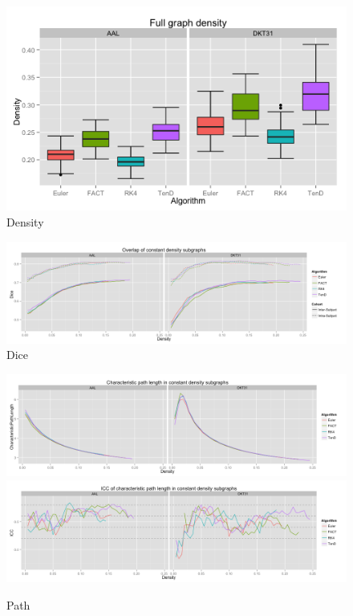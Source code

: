 \documentclass{frontiersSCNS} %
\begin{document}
\begin{figure}
\begin{center}
\includegraphics[width=0.5\linewidth]{figures/density_plot.png} 
\caption{Density}
\label{fig:density}
\end{center}
\end{figure}

\begin{figure}
\begin{center}
\includegraphics[width=0.5\linewidth]{figures/dice_overlap_plot.png} 
\caption{Dice}
\label{fig:dice}
\end{center}
\end{figure}

\begin{figure}
\begin{center}
\includegraphics[width=\linewidth]{figures/path_plot.png} \\
\includegraphics[width=\linewidth]{figures/path_icc_plot.png}
\caption{Path}
\label{fig:path}
\end{center}
\end{figure}
\end{document}
